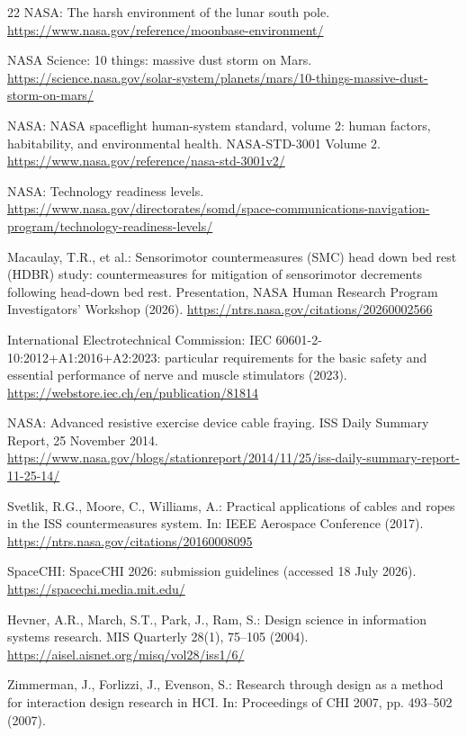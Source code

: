 \documentclass[runningheads]{llncs}
\begin{document}
\begin{thebibliography}{22}
NASA: The harsh environment of the lunar south pole. \url{https://www.nasa.gov/reference/moonbase-environment/}

NASA Science: 10 things: massive dust storm on Mars. \url{https://science.nasa.gov/solar-system/planets/mars/10-things-massive-dust-storm-on-mars/}

NASA: NASA spaceflight human-system standard, volume 2: human factors, habitability, and environmental health. NASA-STD-3001 Volume 2. \url{https://www.nasa.gov/reference/nasa-std-3001v2/}

NASA: Technology readiness levels. \url{https://www.nasa.gov/directorates/somd/space-communications-navigation-program/technology-readiness-levels/}

Macaulay, T.R., et al.: Sensorimotor countermeasures (SMC) head down bed rest (HDBR) study: countermeasures for mitigation of sensorimotor decrements following head-down bed rest. Presentation, NASA Human Research Program Investigators' Workshop (2026). \url{https://ntrs.nasa.gov/citations/20260002566}

International Electrotechnical Commission: IEC 60601-2-10:2012+A1:2016+A2:2023: particular requirements for the basic safety and essential performance of nerve and muscle stimulators (2023). \url{https://webstore.iec.ch/en/publication/81814}

NASA: Advanced resistive exercise device cable fraying. ISS Daily Summary Report, 25 November 2014. \url{https://www.nasa.gov/blogs/stationreport/2014/11/25/iss-daily-summary-report-11-25-14/}

Svetlik, R.G., Moore, C., Williams, A.: Practical applications of cables and ropes in the ISS countermeasures system. In: IEEE Aerospace Conference (2017). \url{https://ntrs.nasa.gov/citations/20160008095}

SpaceCHI: SpaceCHI 2026: submission guidelines (accessed 18 July 2026). \url{https://spacechi.media.mit.edu/}

Hevner, A.R., March, S.T., Park, J., Ram, S.: Design science in information systems research. MIS Quarterly 28(1), 75--105 (2004). \url{https://aisel.aisnet.org/misq/vol28/iss1/6/}

Zimmerman, J., Forlizzi, J., Evenson, S.: Research through design as a method for interaction design research in HCI. In: Proceedings of CHI 2007, pp. 493--502 (2007). 


\end{thebibliography}
\end{document}
